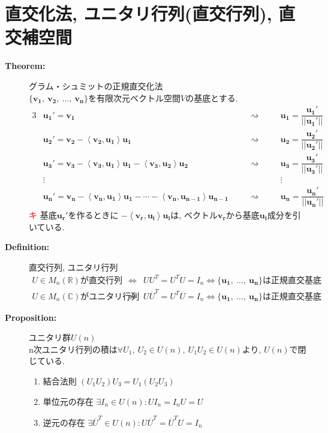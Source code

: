 \documentclass[dvipdfmx]{jsarticle}
\newcommand*{\point}{\textcircled{\textcolor{red}{\scriptsize キ}} }
\newcommand{\tlinner}[2]{%
    \left\langle #1, #2 \right\rangle%
}
\begin{document}
\section{直交化法, ユニタリ行列(直交行列), 直交補空間}
\begin{description}
    \item[\bf{Theorem:}] グラム・シュミットの正規直交化法 \\
        $\{ \bm{v_1},\ \bm{v_2},\ \dots,\ \bm{v_n} \}$を有限次元ベクトル空間$V$の基底とする.
        \begin{alignat*}{3}
            &\bm{u_1}' = \bm{v_1} & \quad & \rightsquigarrow & \quad & \bm{u_1} = \dfrac{\bm{u_1}'}{||\bm{u_1}'||} \\
            &\bm{u_2}' = \bm{v_2} - \tlinner{\bm{v_2}}{\bm{u_1}} \bm{u_1} &  \quad & \rightsquigarrow & \quad & \bm{u_2} = \dfrac{\bm{u_2}'}{||\bm{u_2}'||} \\
            &\bm{u_3}' = \bm{v_3} - \tlinner{\bm{v_3}}{\bm{u_1}} \bm{u_1} - \tlinner{\bm{v_3}}{\bm{u_2}}\bm{u_2} &  \quad & \rightsquigarrow & \quad & \bm{u_3} = \dfrac{\bm{u_3}'}{||\bm{u_3}'||} \\
            & \vdots &  & &  & \vdots \\
            &\bm{u_n}' = \bm{v_n} - \tlinner{\bm{v_n}}{\bm{u_1}}\bm{u_1} - \cdots - \tlinner{\bm{v_n}}{\bm{u_{n-1}}}\bm{u_{n-1}} &  \quad & \rightsquigarrow & \quad & \bm{u_n} = \dfrac{\bm{u_n}'}{||\bm{u_n}'||}
        \end{alignat*}
        \point 基底$\bm{u_r}'$を作るときに $-\tlinner{\bm{v_r}}{\bm{u_i}}\bm{u_i}$は, ベクトル$\bm{v_r}$から基底$\bm{u_i}$成分を引いている.
    \item[\bf{Definition:}] 直交行列, ユニタリ行列
        \begin{eqnarray*}
            U \in M_n(\mathbb{R}) \text{が直交行列} &\Leftrightarrow& UU^T = U^TU = I_n \Leftrightarrow \{ \bm{u_1},\ \dots,\ \bm{u_n} \} \text{は正規直交基底} \\
            U \in M_n(\mathbb{C}) \text{がユニタリ行列} &\Leftrightarrow& U \overline{U}^T = U^T\overline{U} = I_n \Leftrightarrow \{ \bm{u_1},\ \dots,\ \bm{u_n} \} \text{は正規直交基底}
        \end{eqnarray*}
    \item[\bf{Proposition:}] ユニタリ群$U(n)$ \\
        n次ユニタリ行列の積は$\forall U_1,\ U_2 \in U(n),\ U_1U_2 \in U(n)$より, $U(n)$で閉じている.
        \begin{enumerate}
            \item 結合法則 $ (U_1 U_2) U_3 = U_1 (U_2 U_3) $
            \item 単位元の存在 $\exists I_n \in U(n) : UI_n = I_nU = U $
            \item 逆元の存在 $ \exists \overline{U}^T \in U(n) : U\overline{U}^T = \overline{U}^TU = I_n$
        \end{enumerate}


\end{description}
\end{document}
